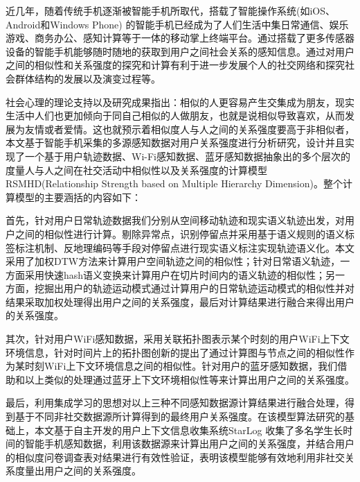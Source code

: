 \begin{cabstract}
近几年，随着传统手机逐渐被智能手机所取代，搭载了智能操作系统(如iOS、Android和Windows Phone) 的智能手机已经成为了人们生活中集日常通信、娱乐游戏、商务办公、感知计算等于一体的移动掌上终端平台。通过搭载了更多传感器设备的智能手机能够随时随地的获取到用户之间社会关系的感知信息。通过对用户之间的相似性和关系强度的探究和计算有利于进一步发展个人的社交网络和探究社会群体结构的发展以及演变过程等。
\par 社会心理的理论支持以及研究成果指出：相似的人更容易产生交集成为朋友，现实生活中人们也更加倾向于同自己相似的人做朋友，也就是说相似导致喜欢，从而发展为友情或者爱情。这也就预示着相似度人与人之间的关系强度要高于非相似者，本文基于智能手机采集的多源感知数据对用户关系强度进行分析研究，设计并且实现了一个基于用户轨迹数据、Wi-Fi感知数据、蓝牙感知数据抽象出的多个层次的度量人与人之间在社交活动中相似性以及关系强度的计算模型RSMHD(Relationship Strength based on Multiple Hierarchy Dimension)。整个计算模型的主要涵括的内容如下：
\par 首先，针对用户日常轨迹数据我们分别从空间移动轨迹和现实语义轨迹出发，对用户之间的相似性进行计算。剔除异常点，识别停留点并采用基于语义规则的语义标签标注机制、反地理编码等手段对停留点进行现实语义标注实现轨迹语义化。本文采用了加权DTW方法来计算用户空间轨迹之间的相似性；针对日常语义轨迹，一方面采用快速hash语义变换来计算用户在切片时间内的语义轨迹的相似性；另一方面，挖掘出用户的轨迹运动模式通过计算用户的日常轨迹运动模式的相似性并对结果采取加权处理得出用户之间的关系强度，最后对计算结果进行融合来得出用户的关系强度。

\par 其次，针对用户WiFi感知数据，采用关联拓扑图表示某个时刻的用户WiFi上下文环境信息，针对时间片上的拓扑图创新的提出了通过计算图与节点之间的相似性作为某时刻WiFi上下文环境信息之间的相似性。针对用户的蓝牙感知数据，我们借助和以上类似的处理通过蓝牙上下文环境相似性等来计算出用户之间的关系强度。

\par 最后，利用集成学习的思想对以上三种不同感知数据源计算结果进行融合处理，得到基于不同非社交数据源所计算得到的最终用户关系强度。在该模型算法研究的基础上，本文基于自主开发的用户上下文信息收集系统StarLog 收集了多名学生长时间的智能手机感知数据，利用该数据源来计算出用户之间的关系强度，并结合用户的相似度问卷调查表对结果进行有效性验证，表明该模型能够有效地利用非社交关系度量出用户之间的关系强度。
\end{cabstract}
